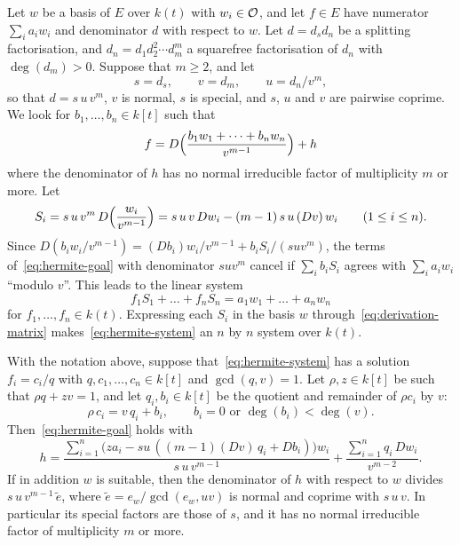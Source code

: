 Let $w$ be a basis of $E$ over $k(t)$ with $w_i \in \mathcal{O}$, and let $f \in E$
have numerator $\sum_i a_i w_i$ and denominator $d$ with respect to $w$. Let $d
= d_s d_n$ be a splitting factorisation, and $d_n = d_1 d_2^2 \cdots d_m^m$ a
squarefree factorisation of $d_n$ with $\deg(d_m) > 0$. Suppose that $m \ge
2$, and let
\[
  s = d_s, \qquad v = d_m, \qquad u = d_n / v^m ,
\]
so that $d = s\,u\,v^m$, $v$ is normal, $s$ is special, and $s$, $u$ and $v$
are pairwise coprime. We look for $b_1, \dots, b_n \in k[t]$ such that
\begin{equation}\label{eq:hermite-goal}
  f = D\Bigl( \frac{b_1 w_1 + \dots + b_n w_n}{v^{m-1}} \Bigr) + h
\end{equation}
where the denominator of $h$ has no normal irreducible factor of multiplicity
$m$ or more. Let
\begin{equation}\label{eq:Si}
  S_i = s\,u\,v^m\, D\Bigl( \frac{w_i}{v^{m-1}} \Bigr)
      = s\,u\,v\, Dw_i - (m-1)\, s\,u\, (Dv)\, w_i
  \qquad (1 \le i \le n).
\end{equation}
Since $D(b_i w_i / v^{m-1}) = (Db_i) w_i / v^{m-1} + b_i S_i / (s u v^m)$, the
terms of~\eqref{eq:hermite-goal} with denominator $s u v^m$ cancel if $\sum_i
b_i S_i$ agrees with $\sum_i a_i w_i$ ``modulo $v$''. This leads to the linear
system
\begin{equation}\label{eq:hermite-system}
  f_1 S_1 + \dots + f_n S_n = a_1 w_1 + \dots + a_n w_n
\end{equation}
for $f_1, \dots, f_n \in k(t)$. Expressing each $S_i$ in the basis $w$
through~\eqref{eq:derivation-matrix} makes~\eqref{eq:hermite-system} an $n$ by
$n$ system over $k(t)$.

\begin{theorem}\label{thm:hermite-step}
With the notation above, suppose that~\eqref{eq:hermite-system} has a solution
$f_i = c_i / q$ with $q, c_1, \dots, c_n \in k[t]$ and $\gcd(q, v) = 1$. Let
$\rho, z \in k[t]$ be such that $\rho q + z v = 1$, and let $q_i, b_i \in
k[t]$ be the quotient and remainder of $\rho c_i$ by $v$:
\[
  \rho\, c_i = v\, q_i + b_i, \qquad b_i = 0 \text{ or } \deg(b_i) < \deg(v).
\]
Then~\eqref{eq:hermite-goal} holds with
\begin{equation}\label{eq:hermite-h}
  h = \frac{\sum_{i=1}^n \bigl( z a_i - s u \,( (m-1) (Dv)\, q_i + D b_i ) \bigr) w_i}
           {s\,u\,v^{m-1}}
      + \frac{\sum_{i=1}^n q_i\, Dw_i}{v^{m-2}} .
\end{equation}
If in addition $w$ is suitable, then the denominator of $h$ with respect to
$w$ divides $s\,u\,v^{m-1}\,\tilde e$, where $\tilde e = e_w / \gcd(e_w, u v)$ is normal and
coprime with $s\,u\,v$. In particular its special factors are those of $s$, and it has no normal
irreducible factor of multiplicity $m$ or more.
\end{theorem}

